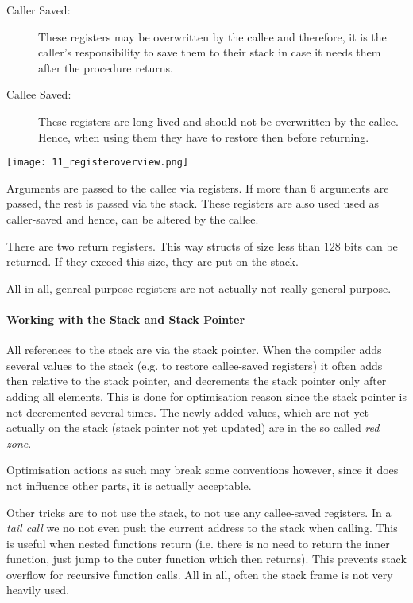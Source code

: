 \begin{description}
    \item[Caller Saved:] These registers may be overwritten by the callee and therefore, it is the caller's responsibility to save them to their stack in case it needs them after the procedure returns.
    \item[Callee Saved:] These registers are long-lived and should not be overwritten by the callee. Hence, when using them they have to restore then before returning.
\end{description}

\texttt{[image: 11\_registeroverview.png]}

Arguments are passed to the callee via registers. If more than $6$ arguments are passed, the rest is passed via the stack. These registers are also used used as caller-saved and hence, can be altered by the callee.

There are two return registers. This way structs of size less than $128$ bits can be returned. If they exceed this size, they are put on the stack.

All in all, genreal purpose registers are not actually not really general purpose.

\paragraph{Working with the Stack and Stack Pointer}
All references to the stack are via the stack pointer. When the compiler adds several values to the stack (e.g. to restore callee-saved registers) it often adds then relative to the stack pointer, and decrements the stack pointer only after adding all elements. This is done for optimisation reason since the stack pointer is not decremented several times. The newly added values, which are not yet actually on the stack (stack pointer not yet updated) are in the so called \textit{red zone}.

Optimisation actions as such may break some conventions however, since it does not influence other parts, it is actually acceptable.

Other tricks are to not use the stack, to not use any callee-saved registers. In a \textit{tail call} we no not even push the current address to the stack when calling. This is useful when nested functions return (i.e. there is no need to return the inner function, just jump to the outer function which then returns). This prevents stack overflow for recursive function calls. All in all, often the stack frame is not very heavily used.
